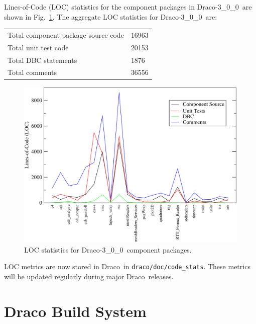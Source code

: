 \documentclass[note]{ResearchNote_pdf}
\newcommand{\draco}{Draco}
\newcommand{\dracor}{\draco-3\_0\_0}
\begin{document}
Lines-of-Code (LOC) statistics for the component packages in \dracor\ 
are shown in Fig.~\ref{fig:stats}.  The aggregate LOC statistics for
\dracor\ are:
\begin{center}
  \begin{tabular}{|l|l|} \hline
    Total component package source code & 16963 \\
    Total unit test code & 20153 \\
    Total DBC statements & 1876 \\
    Total comments & 36556 \\
    \hline
  \end{tabular}
\end{center}
\begin{figure}
  \label{fig:stats}
  \centerline{
    \includegraphics[width=6in]{loc-3_0_0}}
  \caption{LOC statistics for \dracor\ component packages.}
\end{figure}

LOC metrics are now stored in \draco\ in
\texttt{draco/doc/code\_stats}.  These metrics will be updated
regularly during major \draco\ releases.


\section{Draco Build System}
\end{document}
